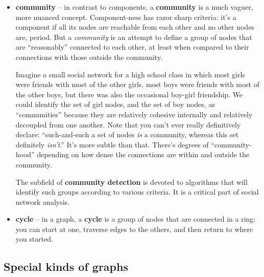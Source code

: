 \documentclass[12pt]{article}
\begin{document}
\begin{itemize}
\item \textbf{community} -- in contrast to components, a \textbf{community} is
a much vaguer, more nuanced concept. Component-ness has razor sharp criteria:
it's a component if all its nodes are reachable from each other and no other
nodes are, period. But a \textit{community} is an attempt to define a group of
nodes that are ``reasonably'' connected to each other, at least when compared
to their connections with those outside the community.

Imagine a small social network for a high school class in which most girls
were friends with most of the other girls, most boys were friends with most of
the other boys, but there was also the occasional boy-girl friendship. We
could identify the set of girl nodes, and the set of boy nodes, as
``communities'' because they are relatively cohesive internally and relatively
decoupled from one another. Note that you can't ever really definitively
declare: ``such-and-such a set of nodes \textit{is} a community, whereas this
set definitely \textit{isn't}.'' It's more subtle than that. There's degrees of
``community-hood'' depending on how dense the connections are within and
outside the community.

The subfield of \textbf{community detection} is devoted to algorithms that
will identify such groups according to various criteria. It is a critical part
of social network analysis.

\item \textbf{cycle} -- in a graph, a \textbf{cycle} is a group of nodes that
are connected in a ring: you can start at one, traverse edges to the others,
and then return to where you started.

\end{itemize}

\subsection{Special kinds of graphs}
\end{document}
